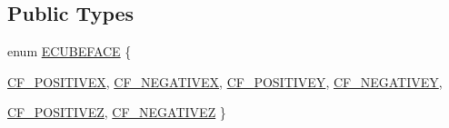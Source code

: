 \subsection*{Public Types}
\begin{CompactItemize}
\item 
enum \hyperlink{class_gr_texture_cube_49c6f83c73520edfce04f4eb5dcfe6a0}{ECUBEFACE} \{ \par
\hyperlink{class_gr_texture_cube_49c6f83c73520edfce04f4eb5dcfe6a08a94a7e78d62ffde00db8ad91b03b760}{CF\_\-POSITIVEX}, 
\hyperlink{class_gr_texture_cube_49c6f83c73520edfce04f4eb5dcfe6a0e4eea2e34ece4cddd0eac3d0ccbc0852}{CF\_\-NEGATIVEX}, 
\hyperlink{class_gr_texture_cube_49c6f83c73520edfce04f4eb5dcfe6a052e05dd6004cdcc6986c5d3264aef90e}{CF\_\-POSITIVEY}, 
\hyperlink{class_gr_texture_cube_49c6f83c73520edfce04f4eb5dcfe6a01dbd31dcc4e3ff4399f07b14447516ae}{CF\_\-NEGATIVEY}, 
\par
\hyperlink{class_gr_texture_cube_49c6f83c73520edfce04f4eb5dcfe6a06d9e4198396a007bbbddeba12443f6ba}{CF\_\-POSITIVEZ}, 
\hyperlink{class_gr_texture_cube_49c6f83c73520edfce04f4eb5dcfe6a05114dcd5206ee6bfbb45bf919dabb061}{CF\_\-NEGATIVEZ}
 \}

\end{CompactItemize}

